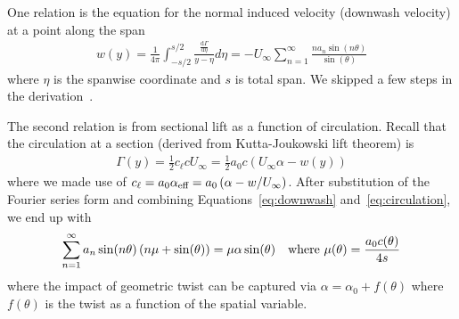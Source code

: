 \documentclass[10pt]{article}
\newcommand{\dd}[2]{\frac{\textrm{d} #1}{\textrm{d} #2}}
\newcommand{\half}{\frac{1}{2}}
\newcommand{\be}{\begin{eqnarray}}
\newcommand{\ee}{\end{eqnarray}}
\newcommand{\Uinf}{U_{\infty}}
\newcommand{\tn}[1]{\textnormal{#1}}
\begin{document}
One relation is the equation for the normal induced velocity (downwash velocity) at a point along the span
\be
\label{eq:downwash}
w(y) = \frac{1}{4\pi}
\int_{-s/2}^{s/2} \frac{\dd{\Gamma}{\eta} }{y - \eta} d\eta
=
\boxed{
    -\Uinf \sum_{n=1}^{\infty} \frac{n a_n \sin \left( n \theta \right)}{\sin(\theta)}
}
\ee
where $\eta$ is the spanwise coordinate and $s$ is total span.
We skipped a few steps in the derivation~\cite[Sec.~3.7]{Kerwin2010}.

The second relation is from sectional lift as a function of circulation.
Recall that the circulation at a section (derived from Kutta-Joukowski lift theorem) is
\be
\label{eq:circulation}
\Gamma(y) = \half c_\ell c \Uinf
=\half a_0 c \left(\Uinf \alpha - w(y)\right)
\ee
where we made use of $c_\ell = a_0 \alpha_{\tn{eff}} = a_0 \left(\alpha - w/\Uinf\right)$.
After substitution of the Fourier series form and combining Equations~\eqref{eq:downwash} and~\eqref{eq:circulation}, we end up with
\be
\label{eq:circulation2}
\sum_{n=1}^{\infty} a_n \sin(n\theta) \left(n\mu + \sin(\theta)\right)
=
\mu \alpha \sin(\theta)
\quad \tn{where }\mu(\theta) = \frac{a_0 c(\theta)}{ 4 s}
\ee
where the impact of geometric twist can be captured via $\alpha = \alpha_0 + f(\theta)$ where $f(\theta)$ is the twist as a function of the spatial variable.
\end{document}
